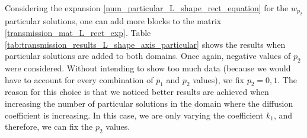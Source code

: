 Considering the expansion \eqref{num_particular_L_shape_rect_equation} for the \(w_{p_2}\) particular solutions, one can add more blocks to the matrix \eqref{transmission_mat_L_rect_exp}. Table \ref{tab:transmission_results_L_shape_axis_particular} shows the results when particular solutions are added to both domains. Once again, negative values of \(p_2\) were considered. Without intending to show too much data (because we would have to account for every combination of \(p_1\) and \(p_2\) values), we fix \(p_2=0, 1\). The reason for this choice is that we noticed better results are achieved when increasing the number of particular solutions in the domain where the diffusion coefficient is increasing. In this case, we are only varying the coefficient \(k_1\), and therefore, we can fix the \(p_2\) values.
\vspace*{1.1cm}
